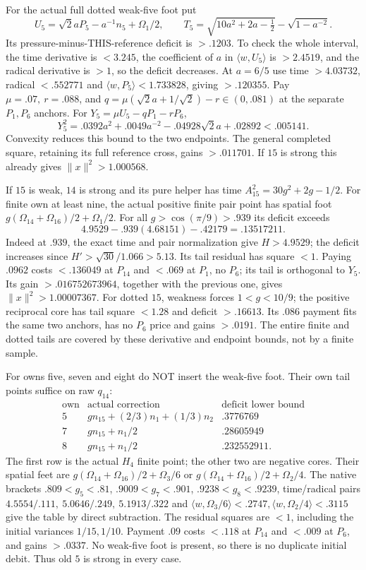 \documentclass[11pt]{article}
\theoremstyle{definition}
\theoremstyle{remark}
\newcommand{\ip}[2]{\langle #1,#2\rangle}
\newcommand{\norm}[1]{\lVert #1\rVert}
\begin{document}
For the actual full dotted weak-five foot put
\[
 U_5=\sqrt2aP_5-a^{-1}n_5+\Omega_1/2,\qquad
 T_5=\sqrt{10a^2+2a-\tfrac12}-\sqrt{1-a^{-2}}.
\]
Its pressure-minus-THIS-reference deficit is \(>.1203\).
To check the whole interval, the time derivative is \(<3.245\),
the coefficient of \(a\) in \(\ip w{U_5}\) is \(>2.4519\),
and the radical derivative is \(>1\), so the deficit decreases.
At \(a=6/5\) use time \(>4.03732\), radical \(<.552771\)
and \(\ip w{P_5}<1.733828\), giving \(>.120355\).
Pay \(\mu=.07,\ r=.088\), and
\(q=\mu(\sqrt2a+1/\sqrt2)-r\in(0,.081)\) at the separate
\(P_1,P_6\) anchors.
For \(Y_5=\mu U_5-qP_1-rP_6\),
\[
 Y_5^2=.0392a^2+.0049a^{-2}-.04928\sqrt2a+.02892<.005141 .
\]
Convexity reduces this bound to the two endpoints.
The general completed square, retaining its full reference cross,
gains \(>.011701\). If \(15\) is strong this already gives
\(\norm x^2>1.000568\).

If \(15\) is weak, \(14\) is strong and its pure helper
has time \(A_{15}^2=30g^2+2g-1/2\).
For finite own at least nine, the actual positive finite pair point
has spatial foot
\(g(\Omega_{14}+\Omega_{16})/2+\Omega_1/2\).
For all \(g>\cos(\pi/9)>.939\) its deficit exceeds
\[
 4.9529-.939(4.68151)-.42179=.13517211 .
\]
Indeed at \(.939\), the exact time and pair normalization give
\(H>4.9529\); the deficit increases since
\(H'>\sqrt{30}/1.066>5.13\).
Its tail residual has square \(<1\).
Paying \(.0962\) costs \(<.136049\) at \(P_{14}\) and
\(<.069\) at \(P_1\), no \(P_6\); its tail is orthogonal to \(Y_5\).
Its gain \(>.016752673964\), together with the previous one,
gives \(\norm x^2>1.00007367\).
For dotted \(15\), weakness forces \(1<g<10/9\);
the positive reciprocal core has tail square \(<1.28\) and
deficit \(>.16613\). Its \(.086\) payment fits the same two
anchors, has no \(P_6\) price and gains \(>.0191\).
The entire finite and dotted tails are covered by these derivative
and endpoint bounds, not by a finite sample.

For owns five, seven and eight do NOT insert the weak-five foot.
Their own tail points suffice on raw \(q_{14}\):
\[
\begin{array}{c|c|c}
\text{own}&\text{actual correction}&\text{deficit lower bound}\\ \hline
5&g n_{15}+(2/3)n_1+(1/3)n_2&.3776769\\
7&g n_{15}+n_1/2&.28605949\\
8&g n_{15}+n_1/2&.232552911 .
\end{array}
\]
The first row is the actual \(H_4\) finite point; the other two
are negative cores.
Their spatial feet are
\(g(\Omega_{14}+\Omega_{16})/2+\Omega_3/6\)
or \(g(\Omega_{14}+\Omega_{16})/2+\Omega_2/4\).
The native brackets \(.809<g_5<.81\),
\(.9009<g_7<.901\), \(.9238<g_8<.9239\),
time/radical pairs \(4.5554/.111,\ 5.0646/.249,\ 5.1913/.322\)
and \(\ip w{\Omega_3/6}<.2747,\ip w{\Omega_2/4}<.3115\)
give the table by direct subtraction.
The residual squares are \(<1\), including the initial variances
\(1/15,1/10\). Payment \(.09\) costs \(<.118\) at \(P_{14}\)
and \(<.009\) at \(P_6\), and gains \(>.0337\).
No weak-five foot is present, so there is no duplicate initial debit.
Thus old \(5\) is strong in every case.
\end{document}
